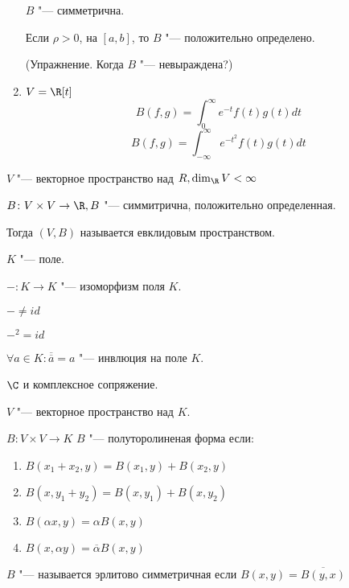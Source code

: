 \begin{exmp}
\begin{enumerate}
$B$ "--- симметрична.

Если $\rho > 0$, на $[a, b]$, то $B$ "--- положительно определено. 

(Упражнение. Когда $B$ "--- невыраждена?)
\item $V = \R[t]$
$$B(f, g) = \int_{0}^{\infty}e^{-t}f(t)g(t)dt$$
$$B(f, g) = \int_{-\infty}^{\infty}e^{-t^2}f(t)g(t)dt$$
\end{enumerate}     
\end{exmp}

\begin{Def}
$V$ "--- векторное пространство над $R, \dim_{\R}V < \infty$

$B \colon V \times V \to \R, B$ "--- симмитрична, положительно определенная.

Тогда $(V, B)$ называется евклидовым пространством. 
\end{Def}

\begin{Def}
$K$ "--- поле.

$-\colon K \to K$ "--- изоморфизм поля $K$.

$- \ne id$

$-^2 = id$

$\forall a \in K\colon \overline{\overline{a}} = a$ "--- инвлюция на поле $K$.
\end{Def}

\begin{exmp}
$\C$ и комплексное сопряжение. 
\end{exmp}

\begin{Def}
$V$ "--- векторное пространство над $K$. 

$B\colon V \times V \to K$  $B$ "--- полуторолиненая форма если:

\begin{enumerate}
\item $B(x_1 + x_2, y) = B(x_1, y) + B(x_2, y)$
\item $B(x, y_1 + y_2) = B(x, y_1) + B(x, y_2)$
\item $B(\alpha x, y) = \alpha B(x, y)$
\item $B(x, \alpha y) = \overline{\alpha}B(x, y)$
\end{enumerate}
\end{Def}

\begin{Def}
$B$ "--- называется эрлитово симметричная если 
$B(x, y) = \overline{B(y, x)}$
\end{Def}

